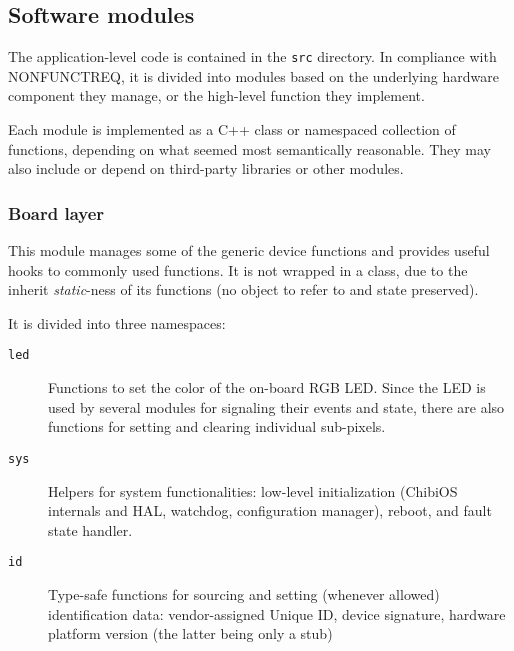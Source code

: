 \subsection{Software modules}
The application-level code is contained in the \texttt{src} directory.
In compliance with NONFUNCTREQ, it is divided into modules based on the underlying hardware component they manage, or the high-level function they implement.

Each module is implemented as a C++ class or namespaced collection of functions, depending on what seemed most semantically reasonable.
They may also include or depend on third-party libraries or other modules.



\subsubsection{Board layer}
This module manages some of the generic device functions and provides useful hooks to commonly used functions.
It is not wrapped in a class, due to the inherit \emph{static}-ness of its functions (no object to refer to and state preserved).

It is divided into three namespaces:
\begin{description}
    \item[\texttt{led}] Functions to set the color of the on-board RGB LED. Since the LED is used by several modules for signaling their events and state, there are also functions for setting and clearing individual sub-pixels.
    \item[\texttt{sys}] Helpers for system functionalities: low-level initialization (ChibiOS internals and HAL, watchdog, configuration manager), reboot, and fault state handler.
    \item[\texttt{id}] Type-safe functions for sourcing and setting (whenever allowed) identification data: vendor-assigned Unique ID, device signature, hardware platform version (the latter being only a stub)
\end{description}


